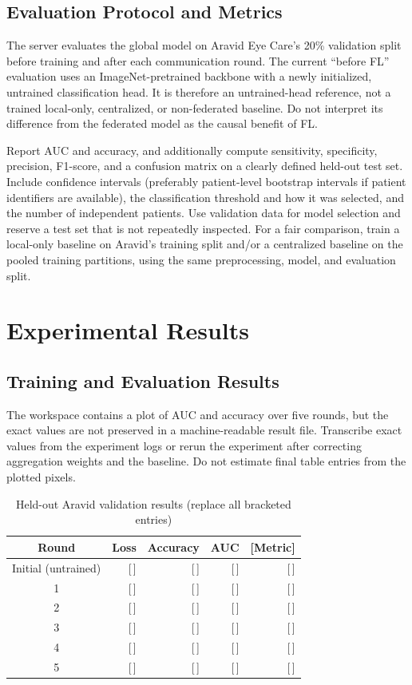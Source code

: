\documentclass[conference]{IEEEtran}
\begin{document}
\subsection{Evaluation Protocol and Metrics}
The server evaluates the global model on Aravid Eye Care's 20\% validation split before training and after each communication round. The current ``before FL'' evaluation uses an ImageNet-pretrained backbone with a newly initialized, untrained classification head. It is therefore an untrained-head reference, not a trained local-only, centralized, or non-federated baseline. Do not interpret its difference from the federated model as the causal benefit of FL.

Report AUC and accuracy, and additionally compute sensitivity, specificity, precision, F1-score, and a confusion matrix on a clearly defined held-out test set. Include confidence intervals (preferably patient-level bootstrap intervals if patient identifiers are available), the classification threshold and how it was selected, and the number of independent patients. Use validation data for model selection and reserve a test set that is not repeatedly inspected. For a fair comparison, train a local-only baseline on Aravid's training split and/or a centralized baseline on the pooled training partitions, using the same preprocessing, model, and evaluation split.

\section{Experimental Results}
\subsection{Training and Evaluation Results}
The workspace contains a plot of AUC and accuracy over five rounds, but the exact values are not preserved in a machine-readable result file. Transcribe exact values from the experiment logs or rerun the experiment after correcting aggregation weights and the baseline. Do not estimate final table entries from the plotted pixels.

\begin{table}[htbp]
\caption{Held-out Aravid validation results (replace all bracketed entries)}
\label{tab:rounds}
\centering
\begin{tabular}{crrrr}
\toprule
\textbf{Round} & \textbf{Loss} & \textbf{Accuracy} & \textbf{AUC} & \textbf{[Metric]}\\
\midrule
Initial (untrained) & [\,] & [\,] & [\,] & [\,]\\
1 & [\,] & [\,] & [\,] & [\,]\\
2 & [\,] & [\,] & [\,] & [\,]\\
3 & [\,] & [\,] & [\,] & [\,]\\
4 & [\,] & [\,] & [\,] & [\,]\\
5 & [\,] & [\,] & [\,] & [\,]\\
\bottomrule
\end{tabular}
\end{table}
\end{document}
